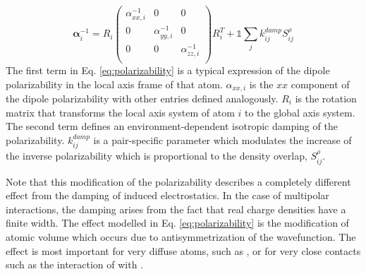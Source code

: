 \documentclass[journal=jctcce,manuscript=article]{achemso}
\begin{document}
\begin{equation}
  \bm{\alpha}^{-1}_i=
  R_i\begin{pmatrix}
    \alpha^{-1}_{xx,i} & 0 & 0 \\
    0 & \alpha^{-1}_{yy,i} & 0 \\
    0 & 0 & \alpha^{-1}_{zz,i} \\
  \end{pmatrix}R_i^T
    +\mathds{1}\sum_{j}k^{damp}_{ij}S_{ij}^\rho
    \label{eq:polarizability}
\end{equation}
\noindent
The first term in Eq. \ref{eq:polarizability} is a typical expression of the dipole polarizability in the local axis frame of that atom. $\alpha_{xx,i}$ is the $xx$ component of the dipole polarizability with other entries defined analogously. $R_i$ is the rotation matrix that transforms the local axis system of atom $i$ to the global axis system. The second term defines an environment-dependent isotropic damping of the polarizability. $k_{ij}^{damp}$ is a pair-specific parameter which modulates the increase of the inverse polarizability which is proportional to the density overlap, $S_{ij}^\rho$.

Note that this modification of the polarizability describes a completely different effect from the damping of induced electrostatics. In the case of multipolar interactions, the damping arises from the fact that real charge densities have a finite width. The effect modelled in Eq. \ref{eq:polarizability} is the modification of atomic volume which occurs due to antisymmetrization of the wavefunction. The effect is most important for very diffuse atoms, such as , or for very close contacts such as the interaction of  with .
\end{document}
